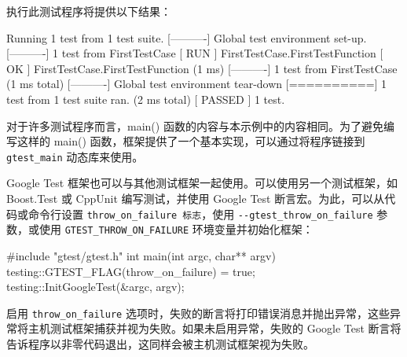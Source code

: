 执行此测试程序将提供以下结果：

\begin{shell}
[==========] Running 1 test from 1 test suite.
[----------] Global test environment set-up.
[----------] 1 test from FirstTestCase
[ RUN      ] FirstTestCase.FirstTestFunction
[       OK ] FirstTestCase.FirstTestFunction (1 ms)
[----------] 1 test from FirstTestCase (1 ms total)
[----------] Global test environment tear-down
[==========] 1 test from 1 test suite ran. (2 ms total)
[  PASSED  ] 1 test.
\end{shell}

对于许多测试程序而言，main() 函数的内容与本示例中的内容相同。为了避免编写这样的 main() 函数，框架提供了一个基本实现，可以通过将程序链接到 \verb|gtest_main| 动态库来使用。


Google Test 框架也可以与其他测试框架一起使用。可以使用另一个测试框架，如 Boost.Test 或 CppUnit 编写测试，并使用 Google Test 断言宏。为此，可以从代码或命令行设置 \verb|throw_on_failure 标志|，使用 \verb|--gtest_throw_on_failure| 参数，或使用 \verb|GTEST_THROW_ON_FAILURE| 环境变量并初始化框架：

\begin{cpp}
#include "gtest/gtest.h"
int main(int argc, char** argv)
{
    testing::GTEST_FLAG(throw_on_failure) = true;
    testing::InitGoogleTest(&argc, argv);
}
\end{cpp}

启用 \verb|throw_on_failure| 选项时，失败的断言将打印错误消息并抛出异常，这些异常将主机测试框架捕获并视为失败。如果未启用异常，失败的 Google Test 断言将告诉程序以非零代码退出，这同样会被主机测试框架视为失败。


